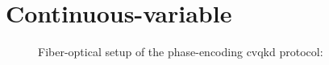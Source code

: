\section{Continuous-variable}


\begin{figure}[htb]
	\centering
	
	\caption{Fiber-optical setup of the phase-encoding \gls{cvqkd} protocol:}
\end{figure}
